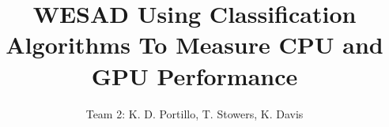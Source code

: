 \documentclass{IEEEtran}
\begin{document}
 
\title{WESAD Using Classification Algorithms To Measure CPU and GPU Performance}
\author{Team 2: K. D. Portillo, T. Stowers, K. Davis}
\maketitle
{}





\end{document}
